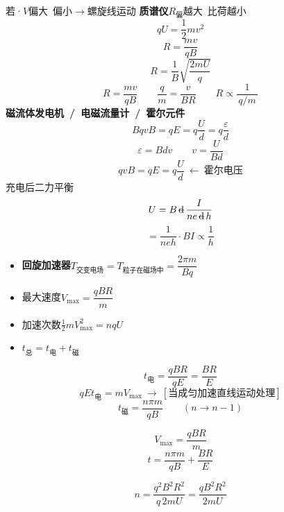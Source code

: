 若·$V$偏大\ 偏小$\to$螺旋线运动
\textbf{质谱仪}\quad $R_{\text{偏}}$越大\ 比荷越小
\[ qU=\frac12 mv^2 \]
\[ R=\frac{mv}{qB} \]
\[ R=\frac1B\sqrt{\frac{2mU}{q}} \]
\[ R=\frac{mv}{qB}\qquad \frac{q}{m}=\frac{v}{BR}\qquad R\propto\frac{1}{\,q/m\,} \]
\textbf{磁流体发电机\ /\ 电磁流量计\ /\ 霍尔元件}
\[ BqvB=qE=q\frac{U}{d}=q\frac{\varepsilon}{d} \]
\[ \varepsilon=Bdv \qquad v=\frac{U}{Bd} \]
\[ qvB=qE=q\frac{U}{d}\ \leftarrow\ \text{霍尔电压} \]
充电后二力平衡
\[ U=B\,\text{\struck{d}}\,\frac{I}{ne\,\text{\struck{d}}\,h} \]
\[ =\frac{1}{neh}\cdot BI\propto\frac1h \]
\begin{itemize}
\item \textbf{回旋加速器}\quad $T_{\text{交变电场}}=T_{\text{粒子在磁场中}}=\dfrac{2\pi m}{Bq}$
\item 最大速度\quad $V_{\max}=\dfrac{qBR}{m}$
\item 加速次数\quad $\frac12 mV_{\max}^2=nqU$
\item $t_{\text{总}}=t_{\text{电}}+t_{\text{磁}}$
\end{itemize}
\[ t_{\text{电}}=\frac{qBR}{qE}=\frac{BR}{E} \]
\[ qEt_{\text{电}}=mV_{\max}\ \to\ [\text{当成匀加速直线运动处理}] \]
\[ t_{\text{磁}}=\frac{n\pi m}{qB}\qquad (n\to n-1) \]
\begin{keybox}
\[ V_{\max}=\frac{qBR}{m} \]
\[ t=\frac{n\pi m}{qB}+\frac{BR}{E} \]
\end{keybox}
\begin{keybox}
\[ n=\frac{q^2B^2R^2}{q\,2mU}=\frac{qB^2R^2}{2mU} \]
\end{keybox}
